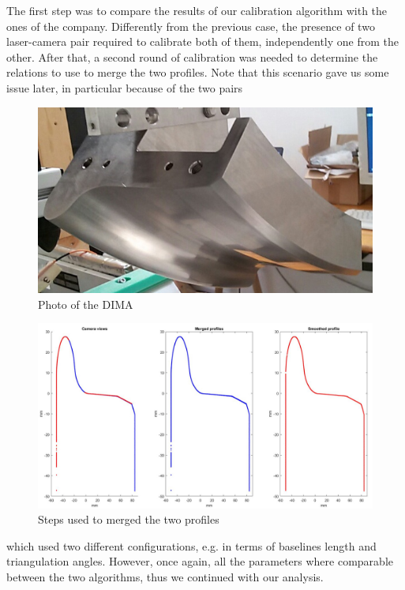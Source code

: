 The first step was to compare the results of our calibration algorithm with the ones of the company. Differently from the previous case, the presence of two laser-camera pair required to calibrate both of them, independently one from the other. After that, a second round of calibration was needed to determine the relations to use to merge the two profiles. Note that this scenario gave us some issue later, in particular because of the two pairs
  \begin{figure}
    \centering
    \includegraphics[width=\textwidth]{./images/analysis/exp2/DIMA.jpg}
    \caption{Photo of the DIMA}
    \label{fig:exp2-dima}
  \end{figure}
\vfill
  
\vfill
  \begin{figure}
    \centering
    \includegraphics[width=\textwidth]{./images/analysis/exp2/wheel_steps.jpg}
    \caption{Steps used to merged the two profiles}
    \label{fig:exp2-merged}
  \end{figure}
\noindent
which used two different configurations, e.g. in terms of baselines length and triangulation angles. However, once again, all the parameters where comparable between the two algorithms, thus we continued with our analysis.

